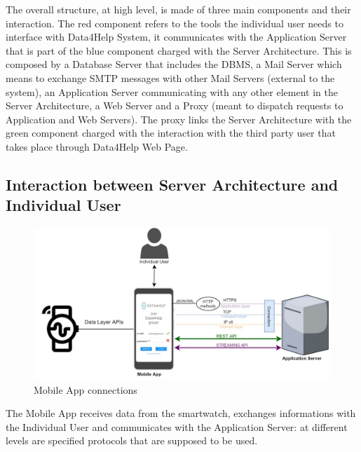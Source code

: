 The overall structure, at high level, is made of three main components and their interaction. 
The red component refers to the tools the individual user needs to interface with Data4Help System, it communicates with the Application Server that is part of the blue component charged with the Server Architecture. This is composed by a Database Server that includes the DBMS, a Mail Server which means to exchange SMTP messages with other Mail Servers (external to the system), an Application Server communicating with any other element in the Server Architecture, a Web Server and a Proxy (meant to dispatch requests to Application and Web Servers). 
The proxy links the Server Architecture with the green component charged with the interaction with the third party user that takes place through Data4Help Web Page. 

\subsection{Interaction between Server Architecture and Individual User}
\begin{figure}[H]
\caption{Mobile App connections}
\includegraphics[width = \textwidth]{sections/architecturalDesign/overview_individual_user.jpg}
\end{figure}

The Mobile App receives data from the smartwatch, exchanges informations with the Individual User and communicates with the Application Server: at different levels are specified protocols that are supposed to be used. 
 

